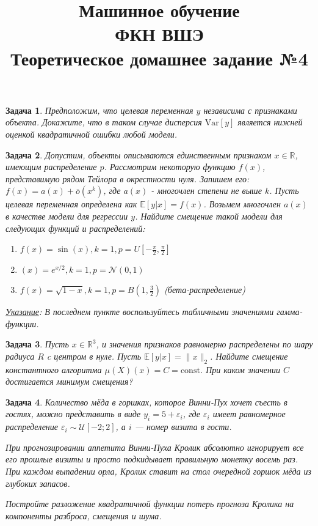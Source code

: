 \documentclass[12pt,fleqn]{article}
\title{Машинное обучение\\ФКН ВШЭ\\Теоретическое домашнее задание №4}
\author{}
\date{}
\newtheorem{esProblem}{Задача}
\begin{document}
\maketitle

\begin{esProblem}
    Предположим, что целевая переменная $y$ независима с признаками объекта. Докажите, что в таком случае дисперсия $\text{Var}[y]$ является нижней оценкой квадратичной ошибки любой модели.
\end{esProblem}

\begin{esProblem}
    Допустим, объекты описываются единственным признаком $x \in \mathbb{R}$, имеющим распределение $p$. Рассмотрим некоторую функцию $f(x)$, представимую рядом Тейлора в окрестности нуля. Запишем его: $f(x) = a(x) + \overline{o}(x^k)$, где $a(x)$ - многочлен степени не выше $k$. Пусть целевая переменная определена как $\mathbb{E}[y|x] = f(x)$. Возьмем многочлен $a(x)$ в качестве модели для регрессии $y$. Найдите смещение такой модели для следующих функций и распределений:
    
    \begin{enumerate}
        \item $f(x) = \sin(x), k = 1, p = U[-\frac{\pi}{2}, \frac{\pi}{2}]$
        \item $(x) = e^{x/2}, k = 1, p = \mathcal{N}(0, 1)$
        \item $f(x) = \sqrt{1 - x}, k = 1, p = B(1, \frac{3}{2})$ (бета-распределение)
    \end{enumerate}
    
    \noindent
    \underline{\it Указание}: В последнем пункте воспользуйтесь табличными значениями гамма-функции.
\end{esProblem}

\begin{esProblem}
    Пусть $x \in \mathbb{R}^3$, и значения признаков равномерно распределены по шару радиуса $R$ c центром в нуле. Пусть $\mathbb{E}[y|x] = \|x\|_2$. Найдите смещение константного алгоритма $\mu(X)(x) = C = \text{const}$. При каком значении $C$ достигается минимум смещения?
\end{esProblem}


\begin{esProblem}
    Количество мёда в горшках, которое Винни-Пух хочет съесть в гостях, можно представить в виде $y_i = 5 + \varepsilon_i$, где $\varepsilon_i$ имеет равномерное распределение $\varepsilon_i \sim \mathcal{U}[-2;2]$, а $i$ — номер визита в гости.
    
    При прогнозировании аппетита Винни-Пуха Кролик абсолютно игнорирует все его прошлые визиты и просто подкидывает правильную монетку восемь раз. При каждом выпадении орла, Кролик ставит на стол очередной горшок мёда из глубоких запасов.
    
    Постройте разложение квадратичной функции потерь прогноза Кролика на компоненты разброса, смещения и шума.
\end{esProblem}
\end{document}
